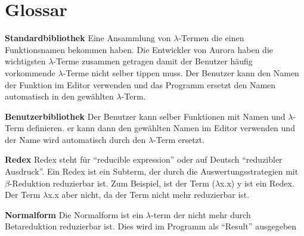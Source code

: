 \documentclass[parskip=full,11pt,twoside]{scrartcl}
\begin{document}
\newpage
{}



\newpage
\section{Glossar}

\textbf{Standardbibliothek}
\newline
Eine Ansammlung von $\lambda$-Termen die einen Funktionsnamen bekommen haben. Die Entwickler von Aurora haben die wichtigsten $\lambda$-Terme zusammen getragen damit der Benutzer häufig vorkommende $\lambda$-Terme nicht selber tippen muss. Der Benutzer kann den Namen der Funktion im Editor verwenden und das Programm ersetzt den Namen automatisch in den gewählten $\lambda$-Term.

\textbf{Benutzerbibliothek}
\newline
Der Benutzer kann selber Funktionen mit Namen und $\lambda$-Term definieren. er kann dann den gewählten Namen im Editor verwenden und der Name wird automatisch durch den $\lambda$-Term ersetzt.

\textbf {Redex}
\newline
Redex steht für \enquote{reducible expression} oder auf Deutsch \enquote{reduzibler Ausdruck}. Ein Redex ist ein Subterm, der durch die Auswertungsstrategien mit $\beta$-Reduktion reduzierbar ist.
\newline
Zum Beispiel, ist der Term ($\lambda$x.x) y ist ein Redex. Der Term $\lambda$x.x aber nicht, da der Term nicht mehr reduzierbar ist.

\textbf{Normalform}
\newline
Die Normalform ist ein $\lambda$-term der nicht mehr durch Betareduktion reduzierbar ist. Dies wird im Programm als \enquote{Result} ausgegeben
\end{document}
